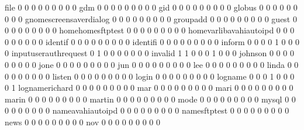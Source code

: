 \documentclass[compress,8pt]{beamer}
\begin{document}
\begin{frame}
\begin{Schunk}
  file                                       0   0   0   0   0   0   0   0   0
  gdm                                        0   0   0   0   0   0   0   0   0
  gid                                        0   0   0   0   0   0   0   0   0
  globus                                     0   0   0   0   0   0   0   0   0
  gnomescreensaverdialog                     0   0   0   0   0   0   0   0   0
  groupadd                                   0   0   0   0   0   0   0   0   0
  guest                                      0   0   0   0   0   0   0   0   0
  homehomesftptest                           0   0   0   0   0   0   0   0   0
  homevarlibavahiautoipd                     0   0   0   0   0   0   0   0   0
  identif                                    0   0   0   0   0   0   0   0   0
  identifi                                   0   0   0   0   0   0   0   0   0
  inform                                     0   0   0   0   1   0   0   0   0
  inputuserauthrequest                       0   1   0   0   0   0   0   0   0
  invalid                                    1   1   0   0   0   1   0   0   0
  johnson                                    0   0   0   0   0   0   0   0   0
  jone                                       0   0   0   0   0   0   0   0   0
  jun                                        0   0   0   0   0   0   0   0   0
  lee                                        0   0   0   0   0   0   0   0   0
  linda                                      0   0   0   0   0   0   0   0   0
  listen                                     0   0   0   0   0   0   0   0   0
  login                                      0   0   0   0   0   0   0   0   0
  logname                                    0   0   0   1   0   0   0   0   1
  lognamerichard                             0   0   0   0   0   0   0   0   0
  mar                                        0   0   0   0   0   0   0   0   0
  mari                                       0   0   0   0   0   0   0   0   0
  marin                                      0   0   0   0   0   0   0   0   0
  martin                                     0   0   0   0   0   0   0   0   0
  mode                                       0   0   0   0   0   0   0   0   0
  mysql                                      0   0   0   0   0   0   0   0   0
  nameavahiautoipd                           0   0   0   0   0   0   0   0   0
  namesftptest                               0   0   0   0   0   0   0   0   0
  news                                       0   0   0   0   0   0   0   0   0
  nov                                        0   0   0   0   0   0   0   0   0

\end{Schunk}
\end{frame}
\end{document}
